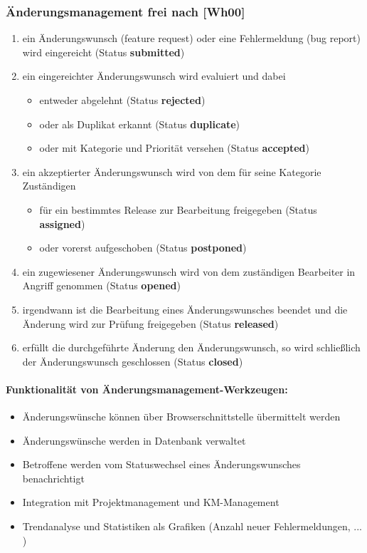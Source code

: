 \subsubsection{Änderungsmanagement frei nach [Wh00]}
\begin{enumerate}
	\item ein Änderungswunsch (feature request) oder eine Fehlermeldung (bug report) wird eingereicht (Status \textbf{submitted})
	\item ein eingereichter Änderungswunsch wird evaluiert und dabei
	\begin{itemize}
		\item entweder abgelehnt (Status \textbf{rejected})
		\item oder als Duplikat erkannt (Status \textbf{duplicate})
		\item oder mit Kategorie und Priorität versehen (Status \textbf{accepted})
	\end{itemize}
	\item ein akzeptierter Änderungswunsch wird von dem für seine Kategorie Zuständigen
	\begin{itemize}
		\item für ein bestimmtes Release zur Bearbeitung freigegeben (Status \textbf{assigned})
		\item oder vorerst aufgeschoben (Status \textbf{postponed})
	\end{itemize}
	\item ein zugewiesener Änderungswunsch wird von dem zuständigen Bearbeiter in Angriff genommen (Status \textbf{opened})
	\item irgendwann ist die Bearbeitung eines Änderungswunsches beendet und die Änderung wird zur Prüfung freigegeben (Status \textbf{released})
	\item erfüllt die durchgeführte Änderung den Änderungswunsch, so wird schließlich der Änderungswunsch geschlossen (Status \textbf{closed})
\end{enumerate}

\paragraph{Funktionalität von Änderungsmanagement-Werkzeugen:}
\begin{itemize}
	\item Änderungswünsche können über Browserschnittstelle übermittelt werden
	\item Änderungswünsche werden in Datenbank verwaltet
	\item Betroffene werden vom Statuswechsel eines Änderungswunsches benachrichtigt
	\item Integration mit Projektmanagement und KM-Management
	\item Trendanalyse und Statistiken als Grafiken (Anzahl neuer Fehlermeldungen, ... )
\end{itemize}

